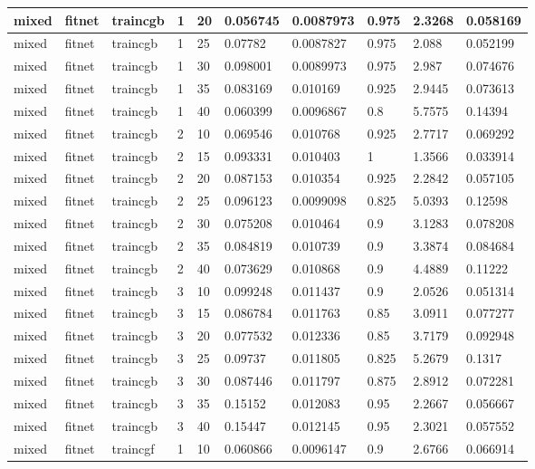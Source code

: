 \begin{longtable}{lllllllll}
mixed & fitnet & traincgb & 1 & 20 & 0.056745 & 0.0087973 & 0.975 & 2.3268 & 0.058169 \\ \hline 
mixed & fitnet & traincgb & 1 & 25 & 0.07782 & 0.0087827 & 0.975 & 2.088 & 0.052199 \\ \hline 
mixed & fitnet & traincgb & 1 & 30 & 0.098001 & 0.0089973 & 0.975 & 2.987 & 0.074676 \\ \hline 
mixed & fitnet & traincgb & 1 & 35 & 0.083169 & 0.010169 & 0.925 & 2.9445 & 0.073613 \\ \hline 
mixed & fitnet & traincgb & 1 & 40 & 0.060399 & 0.0096867 & 0.8 & 5.7575 & 0.14394 \\ \hline 
mixed & fitnet & traincgb & 2 & 10 & 0.069546 & 0.010768 & 0.925 & 2.7717 & 0.069292 \\ \hline 
mixed & fitnet & traincgb & 2 & 15 & 0.093331 & 0.010403 & 1 & 1.3566 & 0.033914 \\ \hline 
mixed & fitnet & traincgb & 2 & 20 & 0.087153 & 0.010354 & 0.925 & 2.2842 & 0.057105 \\ \hline 
mixed & fitnet & traincgb & 2 & 25 & 0.096123 & 0.0099098 & 0.825 & 5.0393 & 0.12598 \\ \hline 
mixed & fitnet & traincgb & 2 & 30 & 0.075208 & 0.010464 & 0.9 & 3.1283 & 0.078208 \\ \hline 
mixed & fitnet & traincgb & 2 & 35 & 0.084819 & 0.010739 & 0.9 & 3.3874 & 0.084684 \\ \hline 
mixed & fitnet & traincgb & 2 & 40 & 0.073629 & 0.010868 & 0.9 & 4.4889 & 0.11222 \\ \hline 
mixed & fitnet & traincgb & 3 & 10 & 0.099248 & 0.011437 & 0.9 & 2.0526 & 0.051314 \\ \hline 
mixed & fitnet & traincgb & 3 & 15 & 0.086784 & 0.011763 & 0.85 & 3.0911 & 0.077277 \\ \hline 
mixed & fitnet & traincgb & 3 & 20 & 0.077532 & 0.012336 & 0.85 & 3.7179 & 0.092948 \\ \hline 
mixed & fitnet & traincgb & 3 & 25 & 0.09737 & 0.011805 & 0.825 & 5.2679 & 0.1317 \\ \hline 
mixed & fitnet & traincgb & 3 & 30 & 0.087446 & 0.011797 & 0.875 & 2.8912 & 0.072281 \\ \hline 
mixed & fitnet & traincgb & 3 & 35 & 0.15152 & 0.012083 & 0.95 & 2.2667 & 0.056667 \\ \hline 
mixed & fitnet & traincgb & 3 & 40 & 0.15447 & 0.012145 & 0.95 & 2.3021 & 0.057552 \\ \hline 
mixed & fitnet & traincgf & 1 & 10 & 0.060866 & 0.0096147 & 0.9 & 2.6766 & 0.066914 \\ \hline 

\end{longtable}
